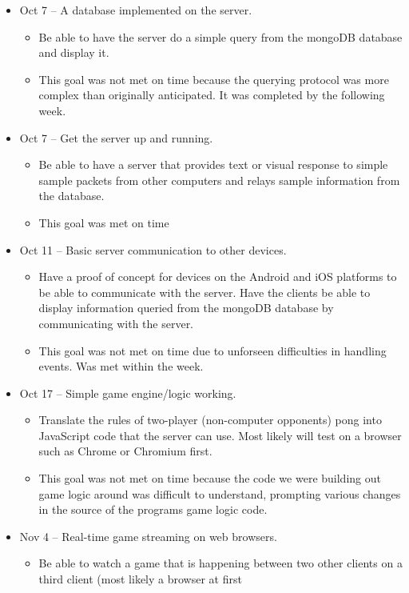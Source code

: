 \documentclass[letterpaper,12pt]{article}
\begin{document}
\begin{itemize}
	\item Oct 7 -- A database implemented on the server.
	\begin{itemize}
		\item  Be able to have the server do a simple query from the mongoDB database and display it.
		\item This goal was not met on time because the querying protocol was more complex than originally anticipated. It was completed by the following week.
	\end{itemize}
	\item Oct 7 -- Get the server up and running. 
	\begin{itemize}
		\item Be able to have a server that provides text or visual response to simple sample packets from other computers and relays sample information from the database.
		\item This goal was met on time
	\end{itemize}
	\item Oct 11 -- Basic server communication to other devices. 
	\begin{itemize}
		\item Have a proof of concept for devices on the Android and iOS platforms to be able to communicate with the server. Have the clients be able to display information queried from the mongoDB database by communicating with the server.
		\item This goal was not met on time due to unforseen difficulties in handling events. Was met within the week.
	\end{itemize}
	\item Oct 17 -- Simple game engine/logic working.
	\begin{itemize}
		\item Translate the rules of two-player (non-computer opponents) pong into JavaScript code that the server can use. Most likely will test on a browser such as Chrome or Chromium first.
		\item This goal was not met on time because the code we were building out game logic around was difficult to understand, prompting various changes in the source of the programs game logic code.
	\end{itemize}
	\item Nov 4 -- Real-time game streaming on web browsers.
	\begin{itemize}
		\item Be able to watch a game that is happening between two other clients on a third client (most likely a browser at first

\end{itemize}
\end{itemize}
\end{document}
